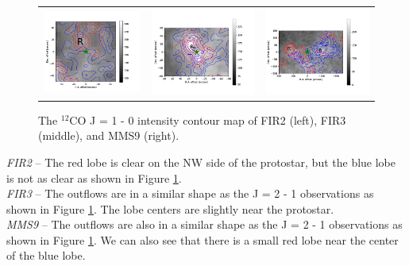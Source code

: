 \begin{figure}[h!]
	\begin{tabular}{ccc}
		\includegraphics[width = 4.3cm]{Orion_12CO_NRO_HOPS68_rbcontour_400} & 
		\includegraphics[width = 4.6cm]{Orion_12CO_NRO_HOPS370_rbcontour_400} & 
		\includegraphics[width = 4.6cm]{Orion_12CO_NRO_HOPS78_rbcontour_400}		
	\end{tabular}
	\caption{The $^{12}$CO J = 1 - 0 intensity contour map of FIR2 (left), FIR3 (middle), and MMS9 (right). }
	\label{fig:12COcontourmap}
\end{figure}

 
\noindent \textit{FIR2} -- The red lobe is clear on the NW side of the protostar, but the blue lobe is not as clear as shown in Figure \ref{fig:12COcontourmap}.\\
\textit{FIR3} -- The outflows are in a similar shape as the J = 2 - 1 observations as shown in Figure \ref{fig:12COcontourmap}. The lobe centers are slightly near the protostar.\\
\textit{MMS9} -- The outflows are also in a similar shape as the J = 2 - 1 observations as shown in Figure \ref{fig:12COcontourmap}. We can also see that there is a small red lobe near the center of the blue lobe.\\
\newpage

